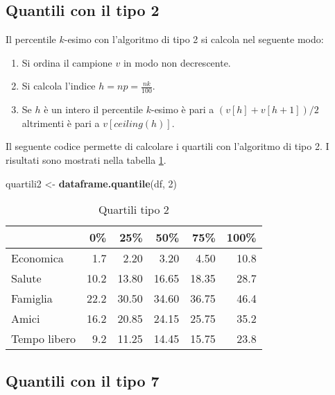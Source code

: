 \documentclass[]{book}
\newenvironment{Shaded}{\begin{snugshade}}{\end{snugshade}}
\newcommand{\KeywordTok}[1]{\textcolor[rgb]{0.13,0.29,0.53}{\textbf{#1}}}
\newcommand{\DecValTok}[1]{\textcolor[rgb]{0.00,0.00,0.81}{#1}}
\newcommand{\StringTok}[1]{\textcolor[rgb]{0.31,0.60,0.02}{#1}}
\newcommand{\NormalTok}[1]{#1}
\providecommand{\tightlist}{%
  \setlength{\itemsep}{0pt}\setlength{\parskip}{0pt}}
\begin{document}
\subsection{Quantili con il tipo 2}\label{quantili-con-il-tipo-2}

Il percentile \(k\)-esimo con l'algoritmo di tipo 2 si calcola nel
seguente modo:

\begin{enumerate}
\def\labelenumi{\arabic{enumi}.}
\tightlist
\item
  Si ordina il campione \(v\) in modo non decrescente.
\item
  Si calcola l'indice \(h = np = \frac{nk}{100}\).
\item
  Se \(h\) è un intero il percentile \(k\)-esimo è pari a
  \((v[h] + v[h+1])/2\) altrimenti è pari a \(v[ceiling(h)]\).
\end{enumerate}

Il seguente codice permette di calcolare i quartili con l'algoritmo di
tipo 2. I risultati sono mostrati nella tabella \ref{tab:quartili2}.

\begin{Shaded}
\begin{Highlighting}[]
\NormalTok{quartili2 <-}\StringTok{ }\KeywordTok{dataframe.quantile}\NormalTok{(df, }\DecValTok{2}\NormalTok{)}
\end{Highlighting}
\end{Shaded}

\begin{table}

\caption{\label{tab:quartili2}Quartili tipo 2}
\centering
\begin{tabular}[t]{l|r|r|r|r|r}
\hline
  & 0\% & 25\% & 50\% & 75\% & 100\%\\
\hline
Economica & 1.7 & 2.20 & 3.20 & 4.50 & 10.8\\
\hline
Salute & 10.2 & 13.80 & 16.65 & 18.35 & 28.7\\
\hline
Famiglia & 22.2 & 30.50 & 34.60 & 36.75 & 46.4\\
\hline
Amici & 16.2 & 20.85 & 24.15 & 25.75 & 35.2\\
\hline
Tempo libero & 9.2 & 11.25 & 14.45 & 15.75 & 23.8\\
\hline
\end{tabular}
\end{table}

\subsection{Quantili con il tipo 7}\label{quantili-con-il-tipo-7}
\end{document}
